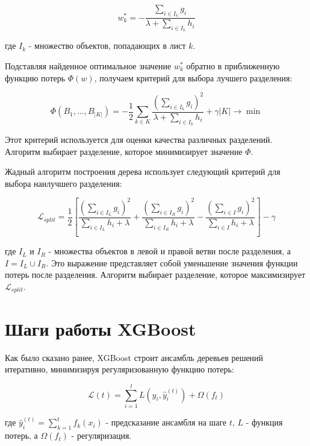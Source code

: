 \[
    w_k^* = - \frac{\sum_{i \in I_k} g_i}{\lambda + \sum_{i \in I_k} h_i}
\]

где $I_k$ - множество объектов, попадающих в лист $k$.

Подставляя найденное оптимальное значение $w_k^*$ обратно в приближенную функцию потерь $\Phi(w)$, получаем критерий для выбора лучшего разделения:

\[
    \Phi(B_1, ..., B_{|K|}) = - \frac{1}{2} \sum_{k \in K} \frac{(\sum_{i \in I_k} g_i)^2}{\lambda + \sum_{i \in I_k} h_i} + \gamma|K| \rightarrow \min
\]

Этот критерий используется для оценки качества различных разделений. Алгоритм выбирает разделение, которое минимизирует значение $\Phi$.

Жадный алгоритм построения дерева использует следующий критерий для выбора наилучшего разделения:

\[
    \mathcal{L}_{split} = \frac{1}{2} \left[ \frac{(\sum_{i \in I_L} g_i)^2}{\sum_{i \in I_L} h_i + \lambda} + \frac{(\sum_{i \in I_R} g_i)^2}{\sum_{i \in I_R} h_i + \lambda} - \frac{(\sum_{i \in I} g_i)^2}{\sum_{i \in I} h_i + \lambda} \right] - \gamma
\]

где $I_L$ и $I_R$ - множества объектов в левой и правой ветви после разделения, а $I = I_L \cup I_R$.  Это выражение представляет собой уменьшение значения функции потерь после разделения.  Алгоритм выбирает разделение, которое максимизирует $\mathcal{L}_{split}$.


\section{Шаги работы  XGBoost}
Как было сказано ранее, XGBoost строит ансамбль деревьев решений итеративно, минимизируя регуляризованную функцию потерь:

\[
    \mathcal{L}(t) = \sum_{i=1}^l L(y_i, \hat{y}_i^{(t)}) + \Omega(f_t)
\]

где $\hat{y}_i^{(t)} = \sum_{k=1}^t f_k(x_i)$ - предсказание ансамбля на шаге $t$, $L$ - функция потерь, а $\Omega(f_t)$ - регуляризация.

